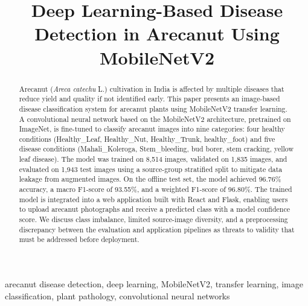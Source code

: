 \documentclass[conference]{IEEEtran}
\begin{document}
\title{Deep Learning-Based Disease Detection in Arecanut Using MobileNetV2}

\author{
\and
{}
}

\maketitle

\begin{abstract}
Arecanut (\textit{Areca catechu} L.) cultivation in India is affected by multiple diseases that reduce yield and quality if not identified early. This paper presents an image-based disease classification system for arecanut plants using MobileNetV2 transfer learning. A convolutional neural network based on the MobileNetV2 architecture, pretrained on ImageNet, is fine-tuned to classify arecanut images into nine categories: four healthy conditions (Healthy\_Leaf, Healthy\_Nut, Healthy\_Trunk, healthy\_foot) and five disease conditions (Mahali\_Koleroga, Stem\_bleeding, bud borer, stem cracking, yellow leaf disease). The model was trained on 8{,}514 images, validated on 1{,}835 images, and evaluated on 1{,}943 test images using a source-group stratified split to mitigate data leakage from augmented images. On the offline test set, the model achieved 96.76\% accuracy, a macro F1-score of 93.55\%, and a weighted F1-score of 96.80\%. The trained model is integrated into a web application built with React and Flask, enabling users to upload arecanut photographs and receive a predicted class with a model confidence score. We discuss class imbalance, limited source-image diversity, and a preprocessing discrepancy between the evaluation and application pipelines as threats to validity that must be addressed before deployment.
\end{abstract}

\begin{IEEEkeywords}
arecanut disease detection, deep learning, MobileNetV2, transfer learning, image classification, plant pathology, convolutional neural networks
\end{IEEEkeywords}
\end{document}

